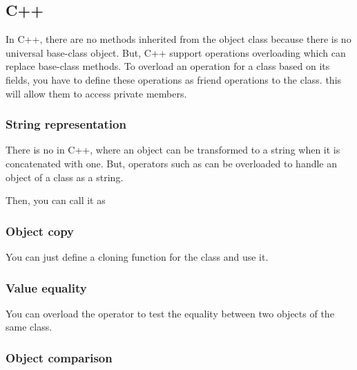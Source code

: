 \documentclass{KodeBook}
\begin{document}
\subsection{C++}

In C++, there are no methods inherited from the object class because there is no universal base-class object. 
But, C++ support operations overloading which can replace base-class methods.
To overload an operation for a class based on its fields, you have to define these operations as friend operations to the class. 
this will allow them to access private members. 



\subsubsection{String representation}

There is no  in C++, where an object can be transformed to a string when it is concatenated with one. 
But, operators such as \keyword{<{}<} can be overloaded to handle an object of a class as a string.   



Then, you can call it as



\subsubsection{Object copy}

You can just define a cloning function for the class and use it.

\subsubsection{Value equality}
 
You can overload the operator \keyword{==} to test the equality between two objects of the same class.  



\subsubsection{Object comparison}
\end{document}
